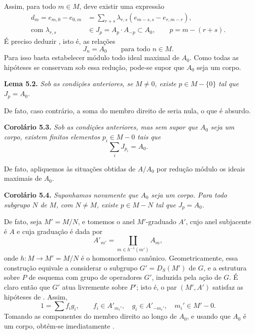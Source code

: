 Assim, para todo \(m\in M\), deve existir uma expressão
\[
  \begin{aligned}
    d_m=e_{m,0}-e_{0,m}
      &=\sum_{r+s}\lambda_{r,s}
        (e_{m-s,s}-e_{r,m-r}),\\
    \text{com }\lambda_{r,s}&\in J_p=A_p\cdot A_{-p}\subset A_0,
      \qquad p=m-(r+s).
  \end{aligned}
  \tag{xxx}\label{sga3:viii:theorem:5:1:eq:xxx:01}
\]
É preciso deduzir , isto é,
as relações
\[
  J_n=A_0
  \qquad\text{para todo \(n\in M\).}
  \tag{xxxx}\label{sga3:viii:theorem:5:1:eq:xxxx:01}
\]
Para isso basta estabelecer
 módulo todo
ideal maximal de \(A_0\). Como todas as hipóteses se conservam sob essa
redução, pode-se supor que \(A_0\) seja um corpo.

\medskip
\noindent{}\textbf{Lema 5.2.}
\textit{Sob as condições anteriores, se \(M\ne0\), existe \(p\in M-\{0\}\) tal que \(J_p=A_0\).}

De fato, caso contrário, a soma do membro direito de
 seria nula, o que é absurdo.

\medskip
\noindent{}\textbf{Corolário 5.3.}
\textit{Sob as condições anteriores, mas sem supor que \(A_0\) seja
um corpo, existem finitos elementos \(p_i\in M-0\) tais que}
\[
  \sum_iJ_{p_i}=A_0.
\]

De fato, apliquemos  às
situações obtidas de \(A/A_0\) por redução módulo os ideais
maximais de \(A_0\).

\medskip
\noindent{}\textbf{Corolário 5.4.}
\textit{Suponhamos novamente que \(A_0\) seja um corpo. Para todo subgrupo
\(N\) de \(M\), com \(N\ne M\), existe \(p\in M-N\) tal que
\(J_p=A_0\).}

De fato, seja \(M'=M/N\), e tomemos o anel \(M'\)-graduado
\(A'\), cujo anel subjacente é \(A\) e cuja graduação é dada por
\[
  A'_{m'}=\coprod_{m\in h^{-1}(m')}A_m,
\]
onde \(h:M\to M'=M/N\) é o homomorfismo canônico. Geometricamente,
essa construção equivale a considerar o subgrupo \(G'=D_S(M')\) de
\(G\), e a estrutura sobre \(P\) de esquema com grupo de operadores
\(G'\), induzida pela ação de \(G\). É claro então que \(G'\) atua
livremente sobre \(P'\); isto é, o par
\((M',A')\) satisfaz as hipóteses de
. Assim,
\[
  1=\sum f_i g_i,
  \qquad
  f_i\in A'_{m_i'},\quad
  g_i\in A'_{-m_i'},\quad
  m_i'\in M'-0.
\]
Tomando as componentes do membro direito ao longo de \(A_0\), e
usando que \(A_0\) é um corpo, obtém-se imediatamente
.

